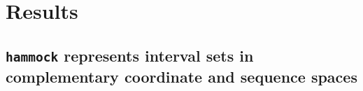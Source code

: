 \documentclass[11pt]{article}
\newcommand{\program}[1]{\texttt{#1}}
\begin{document}

\section{Results}

\subsection{\program{hammock} represents interval sets in complementary coordinate and sequence spaces}
\end{document}
